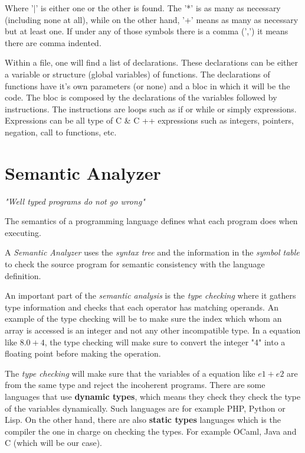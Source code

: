 \documentclass[conference]{IEEEtran}
\begin{document}
Where '$|$' is either one or the other is found. The '*' is as many as necessary (including none at all), while on the other hand, '+' means as many as necessary but at least one. If under any of those symbols there is a comma (',') it means there are comma indented.

Within a file, one will find a list of declarations. These declarations can be either a variable or structure (global variables) of functions. The declarations of functions have it's own parameters (or none) and a bloc in which it will be the code.
The bloc is composed by the declarations of the variables followed by instructions. The instructions are loops such as if or while or simply expressions. Expressions can be all type of C \& C ++ expressions such as integers, pointers, negation, call to functions, etc.   

\section{Semantic Analyzer}
\textit{"Well typed programs do not go wrong"}

The semantics of a programming language defines what each program does when executing.

A \textit{Semantic Analyzer} uses the \textit{syntax tree} and the information in the \textit{symbol table} to check the source program for semantic consistency with the language definition. 

An important part of the \textit{semantic analysis} is the \textit{type checking} where it gathers type information and checks that each operator has matching operands.
An example of the type checking will be to make sure the index which whom an array is accessed is an integer and not any other incompatible type.
In a equation like \(8.0 + 4\), the type checking will make sure to convert the integer "4" into a floating point before making the operation. 

The \textit{type checking} will make sure that the variables of a equation like \(e1 + e2\) are from the same type and reject the incoherent programs. 
There are some languages that use \textbf{dynamic types}, which means they check they check the type of the variables dynamically. Such languages are for example PHP, Python or Lisp. On the other hand, there are also \textbf{static types} languages which is the compiler the one in charge on checking the types. For example OCaml, Java and C (which will be our case).
\end{document}
